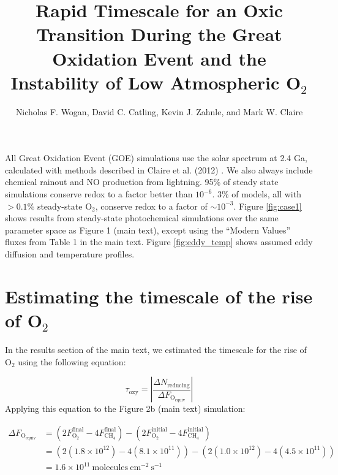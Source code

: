\documentclass[9pt,twoside,lineno]{pnas-new}
\title{Rapid Timescale for an Oxic Transition During the Great Oxidation Event and the Instability of Low Atmospheric O$_2$}
\author{Nicholas F. Wogan, David C. Catling, Kevin J. Zahnle, and Mark W. Claire}
\begin{document}

\maketitle

\SItext

All Great Oxidation Event (GOE) simulations use the solar spectrum at 2.4 Ga, calculated with methods described in Claire et al. (2012) \cite{Claire_2012}. We also always include chemical rainout and NO production from lightning. 95\% of steady state simulations conserve redox to a factor better than $10^{-6}$. 3\% of models, all with $> 0.1\%$ steady-state O$_2$, conserve redox to a factor of $\sim10^{-3}$. Figure \ref{fig:case1} shows results from steady-state photochemical simulations over the same parameter space as Figure 1 (main text), except using the ``Modern Values'' fluxes from Table 1 in the main text. Figure \ref{fig:eddy_temp} shows assumed eddy diffusion and temperature profiles. 

\section*{Estimating the timescale of the rise of O$_2$}

In the results section of the main text, we estimated the timescale for the rise of O$_2$ using the following equation:

\begin{equation} \label{eq:tau_oxy_SI}
    \tau_\text{oxy} = \left| \frac{\Delta N_\text{reducing}}{\Delta F_\mathrm{O_{equiv}}} \right|
\end{equation}
Applying this equation to the Figure 2b (main text) simulation:

\begin{equation}
\begin{split}
\Delta F_\mathrm{O_{equiv}} &= (2 F_\mathrm{O_2}^\text{final} - 4 F_\mathrm{CH_4}^\text{final}) - (2 F_\mathrm{O_2}^\text{initial} - 4 F_\mathrm{CH_4}^\text{initial}) \\
&= (2(1.8\times10^{12}) - 4(8.1\times10^{11})) - (2(1.0\times10^{12}) - 4(4.5\times10^{11})) \\
&= 1.6 \times 10^{11} \:\mathrm{molecules}\:\mathrm{cm^{-2}}\:\mathrm{s^{-1}}
\end{split}
\end{equation}
\end{document}
